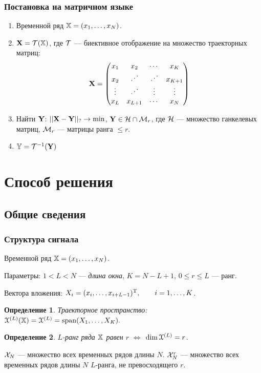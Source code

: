 \documentclass[unicode, notheorems]{beamer}
\newtheorem{definition}{Определение}
\DeclareMathOperator{\mathspan}{span}
\begin{document}
\begin{frame}
	\frametitle{Постановка на матричном языке}
	\begin{enumerate}
		\item Временной ряд $\mathbb{X} = (x_1, \ldots, x_N)$.
		\item $\mathbf{X} = \mathcal{T}(\mathbb{X})$, где $\mathcal{T}$ --- биективное отображение на множество траекторных матриц:
		\begin{equation*}
		\mathbf{X} = \begin{pmatrix}
		x_1 & x_2 & \cdots & x_K \\ 
		x_2 & \iddots & \iddots & x_{K+1} \\ 
		\vdots & \iddots & \vdots & \vdots \\ 
		x_L & x_{L+1} & \cdots & x_N
		\end{pmatrix} 
		\end{equation*}
		\item Найти $\mathbf{Y}$: $||\mathbf{X} - \mathbf{Y}||_? \to \min$, $\mathbf{Y} \in \mathcal{H} \cap \mathcal{M}_r$, где $\mathcal{H}$ --- множество ганкелевых матриц, $\mathcal{M}_r$ --- матрицы ранга $\le r$.
		\item $\mathbb{Y} = \mathcal{T}^{-1}(\mathbf{Y})$
	\end{enumerate}
\end{frame}

\section{Способ решения}
\subsection{Общие сведения}
\begin{frame}
	\frametitle{Структура сигнала}
	
	Временной ряд $\mathbb{X} = (x_1, \ldots, x_N)$.
	
	Параметры: $1 < L < N$ --- \emph{длина окна}, $K = N - L + 1$, $0 \le r \le L$ --- ранг.
	
	Вектора вложения: $X_i = (x_i, \ldots, x_{i + L - 1})^{\mathrm{T}}, \qquad i = 1, \ldots, K$.
	\begin{definition}
		Траекторное пространство: $\spX^{(L)}(\tsX) = \spX^{(L)} = \mathspan(X_1, \ldots, X_K).$
	\end{definition}
	\begin{definition}
		$L$-ранг ряда $\mathbb{X}$ равен $r$ $\Leftrightarrow$ $\dim \EuScript{X}^{(L)} = r$.
	\end{definition}
	
	$\mathcal{X}_N$ --- множество всех временных рядов длины $N$. $\mathcal{X}_N^r$ --- множество всех временных рядов длины $N$ $L$-ранга, не превосходящего $r$.
\end{frame}
\end{document}

